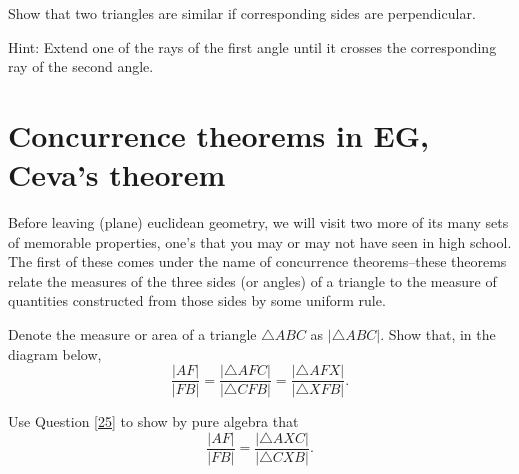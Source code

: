 \documentclass{ximera}
\begin{document}
\begin{question}
Show that two triangles are similar if corresponding sides are perpendicular.

Hint: Extend one of the rays of the first angle until it crosses the
corresponding ray of the second angle.
\end{question}


\section*{Concurrence theorems in \textbf{EG}, Ceva's theorem}

Before leaving (plane) euclidean geometry, we will visit two more of
its many sets of memorable properties, one's that you may or may not
have seen in high school. The first of these comes under the name of
concurrence theorems--these theorems relate the measures of the three
sides (or angles) of a triangle to the measure of quantities
constructed from those sides by some uniform rule.

\begin{question}
\label{25} Denote the measure or area of a triangle $\triangle
ABC$ as $\left\vert \triangle ABC\right\vert $. Show that, in the
diagram below,
\[
\frac{\left\vert AF\right\vert }{\left\vert FB\right\vert }=\frac{\left\vert
\triangle AFC\right\vert }{\left\vert \triangle CFB\right\vert }%
=\frac{\left\vert \triangle AFX\right\vert }{\left\vert \triangle
XFB\right\vert }.
\]
\begin{image}
\end{image}
\end{question}

\begin{question}
\label{26} Use Question \ref{25} to show by pure algebra that%
\begin{equation}
\frac{\left\vert AF\right\vert }{\left\vert FB\right\vert }=\frac{\left\vert
\triangle AXC\right\vert }{\left\vert \triangle CXB\right\vert }. \label{27}%
\end{equation}

\end{question}
\end{document}
